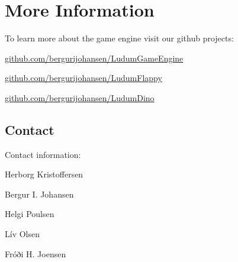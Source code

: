 \chapter{More Information}
To learn more about the game engine visit our github projects:

\href{https://github.com/bergurijohansen/LudumGameEngine}{github.com/bergurijohansen/LudumGameEngine}

\href{https://github.com/bergurijohansen/LudumFlappy}{github.com/bergurijohansen/LudumFlappy}

\href{https://github.com/bergurijohansen/LudumDino}{github.com/bergurijohansen/LudumDino}

\section{Contact}

Contact information:

Herborg Kristoffersen

Bergur I. Johansen

Helgi Poulsen

Lív Olsen

Fróði H. Joensen

